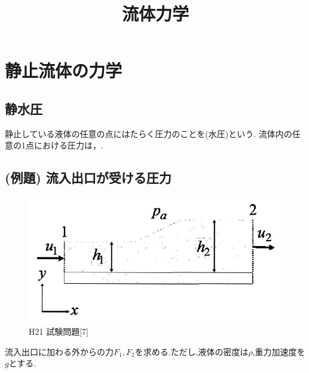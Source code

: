 \documentclass[a4paper]{jsarticle}
\author{}
\title{流体力学}
\date{}
\begin{document}
\maketitle
\tableofcontents
\newpage

\section{静止流体の力学}
\subsection{静水圧}
静止している液体の任意の点にはたらく圧力のことを(水圧)という.
流体内の任意の1点における圧力は，.
\subsection{(例題) 流入出口が受ける圧力}
\begin{figure}[htbp]
    \begin{center}
        \includegraphics[width=120mm]{images/ryuriki_image4.jpg}
        \caption{H21 試験問題[7]}
    \end{center}
\end{figure}
流入出口に加わる外からの力$F_1,F_2$を求める.ただし,液体の密度は$\rho$,重力加速度を$g$とする.
\end{document}
